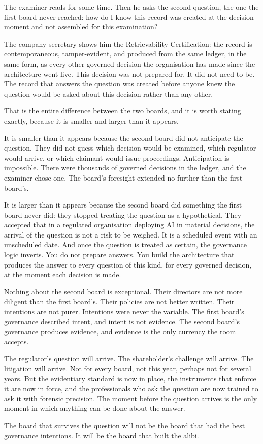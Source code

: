 The examiner reads for some time. Then he asks the second question, the one the first board never reached: how do I know this record was created at the decision moment and not assembled for this examination?

The company secretary shows him the Retrievability Certification: the record is contemporaneous, tamper-evident, and produced from the same ledger, in the same form, as every other governed decision the organisation has made since the architecture went live. This decision was not prepared for. It did not need to be. The record that answers the question was created before anyone knew the question would be asked about this decision rather than any other.

That is the entire difference between the two boards, and it is worth stating exactly, because it is smaller and larger than it appears.

It is smaller than it appears because the second board did not anticipate the question. They did not guess which decision would be examined, which regulator would arrive, or which claimant would issue proceedings. Anticipation is impossible. There were thousands of governed decisions in the ledger, and the examiner chose one. The board's foresight extended no further than the first board's.

It is larger than it appears because the second board did something the first board never did: they stopped treating the question as a hypothetical. They accepted that in a regulated organisation deploying AI in material decisions, the arrival of the question is not a risk to be weighed. It is a scheduled event with an unscheduled date. And once the question is treated as certain, the governance logic inverts. You do not prepare answers. You build the architecture that produces the answer to every question of this kind, for every governed decision, at the moment each decision is made.

Nothing about the second board is exceptional. Their directors are not more diligent than the first board's. Their policies are not better written. Their intentions are not purer. Intentions were never the variable. The first board's governance described intent, and intent is not evidence. The second board's governance produces evidence, and evidence is the only currency the room accepts.

The regulator's question will arrive. The shareholder's challenge will arrive. The litigation will arrive. Not for every board, not this year, perhaps not for several years. But the evidentiary standard is now in place, the instruments that enforce it are now in force, and the professionals who ask the question are now trained to ask it with forensic precision. The moment before the question arrives is the only moment in which anything can be done about the answer.

The board that survives the question will not be the board that had the best governance intentions. It will be the board that built the alibi.
